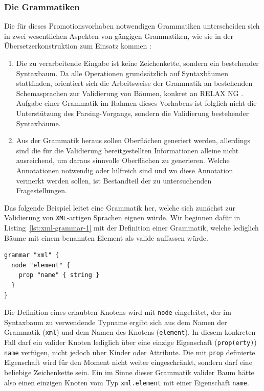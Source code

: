\documentclass[paper=a4,fontsize=11pt,parskip=half]{scrartcl}
\begin{document}
\subsubsection{Die Grammatiken}
\label{sec:grammars}

Die für dieses Promotionsvorhaben notwendigen Grammatiken unterscheiden sich in zwei wesentlichen Aspekten von gängigen Grammatiken, wie sie in der Übersetzerkonstruktion zum Einsatz kommen \cite[S. 42ff]{aho_compilers:_2007}:

\begin{enumerate}
\item Die zu verarbeitende Eingabe ist keine Zeichenkette, sondern ein bestehender Syntaxbaum. Da alle Operationen grundsätzlich auf Syntaxbäumen stattfinden, orientiert sich die Arbeitsweise der Grammatik an bestehenden Schemasprachen zur Validierung von Bäumen, konkret an RELAX NG \cite{clark_relax_2001}. Aufgabe einer Grammatik im Rahmen dieses Vorhabens ist folglich nicht die Unterstützung des Parsing-Vorgangs, sondern die Validierung bestehender Syntaxbäume.
\item Aus der Grammatik heraus sollen Oberflächen generiert werden, allerdings sind die für die Validierung bereitgestellten Informationen alleine nicht ausreichend, um daraus sinnvolle Oberflächen zu generieren. Welche Annotationen notwendig oder hilfreich sind und wo diese Annotation vermerkt werden sollen, ist Bestandteil der zu untersuchenden Fragestellungen.
\end{enumerate}

Das folgende Beispiel leitet eine Grammatik her, welche sich zunächst zur Validierung von \texttt{XML}-artigen Sprachen eignen würde. Wir beginnen dafür in Listing~\ref{lst:xml-grammar-1} mit der Definition einer Grammatik, welche lediglich Bäume mit einem benannten Element als valide auffassen würde.

\begin{lstlisting}[float=h, label={lst:xml-grammar-1},caption={\texttt{XML} Schritt 1 - Elemente mit Namen},captionpos=b,language={Grammar}]
grammar "xml" {
  node "element" {
    prop "name" { string }
  }
}
\end{lstlisting}

Die Definition eines erlaubten Knotens wird mit \texttt{node} eingeleitet, der im Syntaxbaum zu verwendende Typname ergibt sich aus dem Namen der Grammatik (\texttt{xml}) und dem Namen des Knotens (\texttt{element}). In diesem konkreten Fall darf ein valider Knoten lediglich über eine einzige Eigenschaft (\texttt{prop(erty)}) \texttt{name} verfügen, nicht jedoch über Kinder oder Attribute. Die mit \texttt{prop} definierte Eigenschaft wird für den Moment nicht weiter eingeschränkt, sondern darf eine beliebige Zeichenkette sein. Ein im Sinne dieser Grammatik valider Baum hätte also einen einzigen Knoten vom Typ \texttt{xml.element} mit einer Eigenschaft \texttt{name}.
\end{document}
